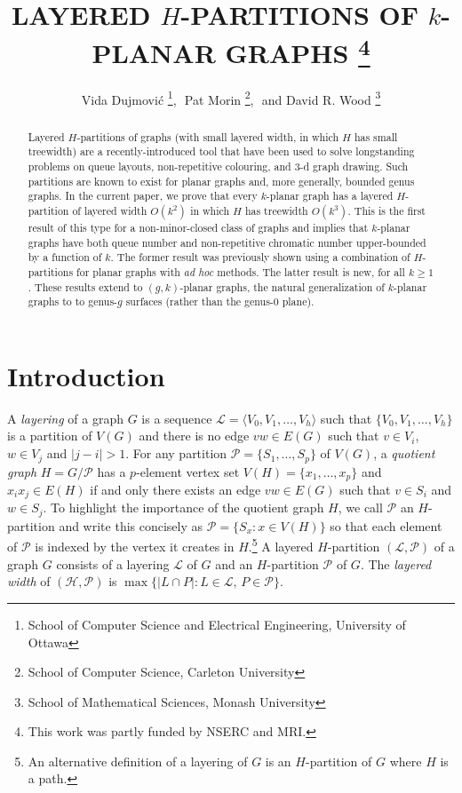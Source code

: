 \documentclass{patmorin}
\title{\MakeUppercase{Layered $H$-Partitions of $k$-Planar Graphs}%
    \thanks{This work was partly funded by NSERC and MRI.}}
\author{Vida Dujmovi\'c%
        \thanks{School of Computer Science and Electrical Engineering,
                University of Ottawa},\,\,
        Pat Morin%
        \thanks{School of Computer Science, Carleton University},\,\, and
        David R. Wood%
        \thanks{School of Mathematical Sciences, Monash University}}
\begin{document}
\maketitle


\begin{abstract}
  Layered $H$-partitions of graphs (with small layered width, in which $H$ has small treewidth) are a recently-introduced tool that have been used to solve longstanding problems on queue layouts, non-repetitive colouring, and 3-d graph drawing.  Such partitions are known to exist for planar graphs and, more generally, bounded genus graphs.  In the current paper, we prove that every $k$-planar graph has a layered $H$-partition of layered width $O(k^2)$ in which $H$ has treewidth $O(k^3)$. This is the first result of this type for a non-minor-closed class of graphs and implies that $k$-planar graphs have both queue number and non-repetitive chromatic number upper-bounded by a function of $k$.  The former result was previously shown using a combination of $H$-partitions for planar graphs with \textit{ad hoc} methods. The latter result is new, for all $k\ge 1$.  These results extend to $(g,k)$-planar graphs, the natural generalization of $k$-planar graphs to to genus-$g$ surfaces (rather than the genus-$0$ plane).
\end{abstract}

\section{Introduction}

A \emph{layering} of a graph $G$ is a sequence $\mathcal{L}=\langle V_0,V_1,\ldots,V_h\rangle$ such that $\{V_0,V_1,\ldots,V_h\}$ is a partition of $V(G)$ and there is no edge $vw\in E(G)$ such that $v\in V_i$, $w\in V_j$ and $|j-i|>1$.  For any partition $\mathcal{P}=\{S_1,\ldots,S_p\}$ of $V(G)$, a \emph{quotient graph} $H=G/\mathcal{P}$ has a $p$-element vertex set $V(H)=\{x_1,\ldots,x_p\}$ and $x_ix_j\in E(H)$ if and only there exists an edge $vw\in E(G)$ such that $v\in S_i$ and $w\in S_j$. To highlight the importance of the quotient graph $H$, we call $\mathcal{P}$ an $H$-partition and write this concisely as $\mathcal{P}=\{S_x : x\in V(H)\}$ so that each element of $\mathcal{P}$ is indexed by the vertex it creates in $H$.\footnote{An alternative definition of a layering of $G$ is an $H$-partition of $G$ where $H$ is a path.}  A layered $H$-partition $(\mathcal{L},\mathcal{P})$ of a graph $G$ consists of a layering $\mathcal{L}$ of $G$ and an $H$-partition $\mathcal{P}$ of $G$. The \emph{layered width} of $(\mathcal{H},\mathcal{P})$ is $\max\{|L\cap P|: L\in\mathcal{L},\, P\in\mathcal{P}\}$.
\end{document}
